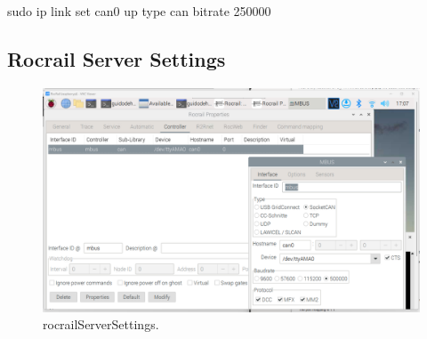 sudo ip link set can0 up type can bitrate 250000


\subsection{Rocrail Server Settings}



\begin{figure}[h!]
	\centering
	\includegraphics[width=1.00\linewidth]{../figures/rocrailServerSettings.png}
	\caption{rocrailServerSettings.}
	\label{fig:rocrailServerSettings}
\end{figure}


